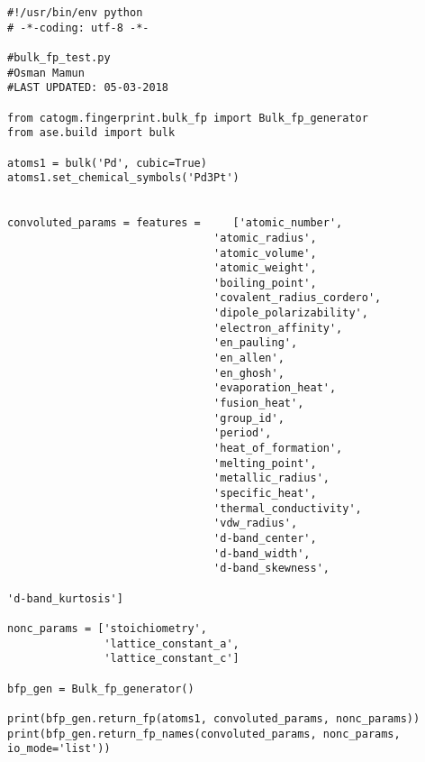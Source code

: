 \documentclass[11pt]{article}
\begin{document}
\begin{verbatim}
#!/usr/bin/env python
# -*-coding: utf-8 -*-

#bulk_fp_test.py
#Osman Mamun
#LAST UPDATED: 05-03-2018

from catogm.fingerprint.bulk_fp import Bulk_fp_generator
from ase.build import bulk

atoms1 = bulk('Pd', cubic=True)
atoms1.set_chemical_symbols('Pd3Pt')


convoluted_params = features =     ['atomic_number',                                            
                                'atomic_radius',                                            
                                'atomic_volume',                                            
                                'atomic_weight',                                            
                                'boiling_point',                                            
                                'covalent_radius_cordero',                                  
                                'dipole_polarizability',                                    
                                'electron_affinity',                                        
                                'en_pauling',                                               
                                'en_allen',                                                 
                                'en_ghosh',                                                 
                                'evaporation_heat',                                         
                                'fusion_heat',                                              
                                'group_id',                                                 
                                'period',                                                   
                                'heat_of_formation',                                        
                                'melting_point',                                            
                                'metallic_radius',                                          
                                'specific_heat',                                            
                                'thermal_conductivity',                                     
                                'vdw_radius',                                               
                                'd-band_center',                                            
                                'd-band_width',                                             
                                'd-band_skewness',                                          

'd-band_kurtosis']     

nonc_params = ['stoichiometry', 
               'lattice_constant_a',                                       
               'lattice_constant_c']                                       

bfp_gen = Bulk_fp_generator()

print(bfp_gen.return_fp(atoms1, convoluted_params, nonc_params))
print(bfp_gen.return_fp_names(convoluted_params, nonc_params, io_mode='list'))

\end{verbatim}
\end{document}
